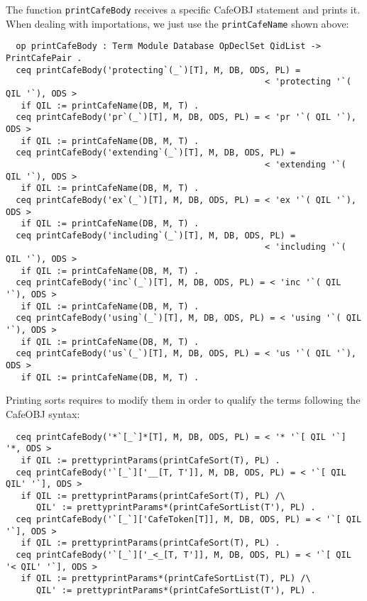 The function \verb"printCafeBody" receives a specific CafeOBJ statement and prints it.
When dealing with importations, we just use the \texttt{printCafeName} shown above:


{\codesize
\begin{verbatim}
  op printCafeBody : Term Module Database OpDeclSet QidList -> PrintCafePair .
  ceq printCafeBody('protecting`(_`)[T], M, DB, ODS, PL) =
                                                   < 'protecting '`( QIL '`), ODS >
   if QIL := printCafeName(DB, M, T) .
  ceq printCafeBody('pr`(_`)[T], M, DB, ODS, PL) = < 'pr '`( QIL '`), ODS >
   if QIL := printCafeName(DB, M, T) .
  ceq printCafeBody('extending`(_`)[T], M, DB, ODS, PL) =
                                                   < 'extending '`( QIL '`), ODS >
   if QIL := printCafeName(DB, M, T) .
  ceq printCafeBody('ex`(_`)[T], M, DB, ODS, PL) = < 'ex '`( QIL '`), ODS >
   if QIL := printCafeName(DB, M, T) .
  ceq printCafeBody('including`(_`)[T], M, DB, ODS, PL) =
                                                   < 'including '`( QIL '`), ODS >
   if QIL := printCafeName(DB, M, T) .
  ceq printCafeBody('inc`(_`)[T], M, DB, ODS, PL) = < 'inc '`( QIL '`), ODS >
   if QIL := printCafeName(DB, M, T) .
  ceq printCafeBody('using`(_`)[T], M, DB, ODS, PL) = < 'using '`( QIL '`), ODS >
   if QIL := printCafeName(DB, M, T) .
  ceq printCafeBody('us`(_`)[T], M, DB, ODS, PL) = < 'us '`( QIL '`), ODS >
   if QIL := printCafeName(DB, M, T) .
\end{verbatim}
}

Printing sorts requires to modify them in order to qualify the terms following the
CafeOBJ syntax:


{\codesize
\begin{verbatim}
  ceq printCafeBody('*`[_`]*[T], M, DB, ODS, PL) = < '* '`[ QIL '`] '*, ODS >
   if QIL := prettyprintParams(printCafeSort(T), PL) .
  ceq printCafeBody('`[_`]['__[T, T']], M, DB, ODS, PL) = < '`[ QIL QIL' '`], ODS >
   if QIL := prettyprintParams(printCafeSort(T), PL) /\
      QIL' := prettyprintParams*(printCafeSortList(T'), PL) .
  ceq printCafeBody('`[_`]['CafeToken[T]], M, DB, ODS, PL) = < '`[ QIL '`], ODS >
   if QIL := prettyprintParams(printCafeSort(T), PL) .
  ceq printCafeBody('`[_`]['_<_[T, T']], M, DB, ODS, PL) = < '`[ QIL '< QIL' '`], ODS >
   if QIL := prettyprintParams*(printCafeSortList(T), PL) /\
      QIL' := prettyprintParams*(printCafeSortList(T'), PL) .
\end{verbatim}
}

